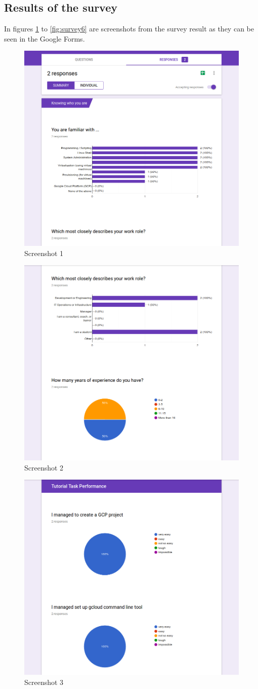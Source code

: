 \subsection{Results of the survey}\label{app:survey}

In figures \ref{fig:survey1} to \ref{fig:survey6} are screenshots from the survey result as
they can be seen in the Google Forms.

	\begin{figure}
		 \centering
		 \includegraphics[width=.5\textwidth]{Images/cropped/crop_1.png}
		 \caption{Screenshot 1}
		 \label{fig:survey1}
	\end{figure}
	\begin{figure}
		 \centering
		 \includegraphics[width=.5\textwidth]{Images/cropped/crop_2.png}
		 \caption{Screenshot 2}
		 \label{fig:survey2}
	\end{figure}
	\begin{figure}
		 \centering
		 \includegraphics[width=.5\textwidth]{Images/cropped/crop_3.png}
		 \caption{Screenshot 3}
		 \label{fig:survey3}
	\end{figure}
